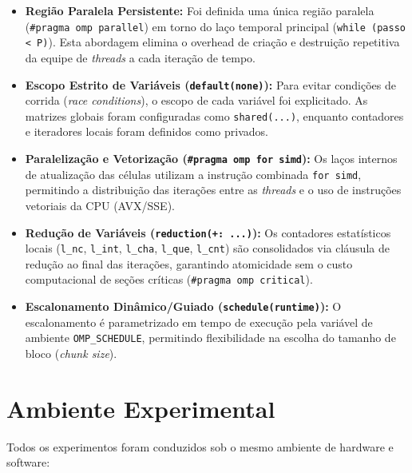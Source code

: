 \documentclass[a4paper,12pt]{article}
\begin{document}
\begin{itemize}
    \item \textbf{Região Paralela Persistente:} Foi definida uma única região paralela (\texttt{\#pragma omp parallel}) em torno do laço temporal principal (\texttt{while (passo < P)}). Esta abordagem elimina o overhead de criação e destruição repetitiva da equipe de \textit{threads} a cada iteração de tempo.
    \item \textbf{Escopo Estrito de Variáveis (\texttt{default(none)}):} Para evitar condições de corrida (\textit{race conditions}), o escopo de cada variável foi explicitado. As matrizes globais foram configuradas como \texttt{shared(...)}, enquanto contadores e iteradores locais foram definidos como privados.
    \item \textbf{Paralelização e Vetorização (\texttt{\#pragma omp for simd}):} Os laços internos de atualização das células utilizam a instrução combinada \texttt{for simd}, permitindo a distribuição das iterações entre as \textit{threads} e o uso de instruções vetoriais da CPU (AVX/SSE).
    \item \textbf{Redução de Variáveis (\texttt{reduction(+: ...)}):} Os contadores estatísticos locais (\texttt{l\_nc}, \texttt{l\_int}, \texttt{l\_cha}, \texttt{l\_que}, \texttt{l\_cnt}) são consolidados via cláusula de redução ao final das iterações, garantindo atomicidade sem o custo computacional de seções críticas (\texttt{\#pragma omp critical}).
    \item \textbf{Escalonamento Dinâmico/Guiado (\texttt{schedule(runtime)}):} O escalonamento é parametrizado em tempo de execução pela variável de ambiente \texttt{OMP\_SCHEDULE}, permitindo flexibilidade na escolha do tamanho de bloco (\textit{chunk size}).
\end{itemize}

\section{Ambiente Experimental}

Todos os experimentos foram conduzidos sob o mesmo ambiente de hardware e software:
\end{document}
